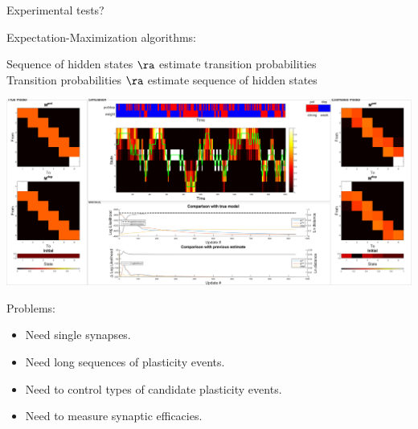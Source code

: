 \documentclass[final,hyperref={pdfpagelabels=false,bookmarks=false}]{beamer}
\begin{document}
\begin{frame}{}
\begin{columns}[t]
\begin{column}{0.33\linewidth}
\begin{block}{Experimental tests?}
\begin{center}
\begin{inlineenumerate}
     \item {} \hspace{0.02\linewidth}
     \item {}
   \end{inlineenumerate}
 \end{center}

 \vp Expectation-Maximization algorithms:
 \parbox[t]{0.5\linewidth}{
   Sequence of hidden states $\ra$ estimate transition probabilities \\
   Transition probabilities $\ra$ estimate sequence of hidden states
 }

 \begin{center}
   \includegraphics[width=0.87\linewidth]{FitVid939.svg}
 \end{center}
%

 \vp Problems:
 \begin{itemize}
   \item Need single synapses.
   \item Need long sequences of plasticity events.
   \item Need to control types of candidate plasticity events.
   \item Need to measure synaptic efficacies.
 \end{itemize}
%
\end{block}


\end{column}
\end{columns}
\end{frame}
\end{document}
